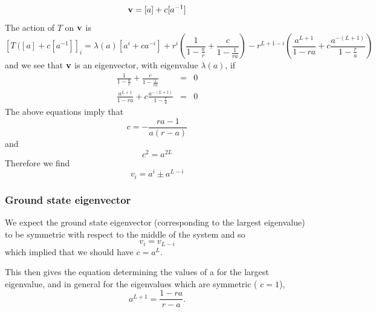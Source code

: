 \begin{equation}
{\bf v} = [a]+ c[a^{-1}]
\end{equation}
The action of $T$ on ${\bf v}$ is 
\begin{equation}
\left[T\ ([a]+c [a^{-1}]\right]_i = \lambda(a)[a^i + c a^{-i}]
+ r^i\left(\frac{1}{1-\frac{a}{r}}+ \frac{c}{1-\frac{1}{ra}}\right)
- r^{L+1-i} \left(\frac{a^{L+1}}{1-ra} + c\frac{a^{-(L+1)}}{1-\frac{r}{a}}\right)
\end{equation}
and we see that ${\bf v}$ is an eigenvector, with eigenvalue $\lambda(a)$, if
\begin{eqnarray}
\frac{1}{1-\frac{a}{r}}+ \frac{c}{1-\frac{1}{ra}}&=&0 \\
\frac{a^{L+1}}{1-ra} + c\frac{a^{-(L+1)}}{1-\frac{r}{a}} &=& 0
\end{eqnarray}
The above equations imply that 
\begin{equation}
c= -\frac{ra-1}{a(r-a)}
\end{equation}
and
\begin{equation}
c^2 = a^{2L}
\end{equation}
Therefore we find
\begin{equation}
v_i = a^i \pm a^{L-i}
\end{equation}

\subsubsection*{Ground state eigenvector}
We expect the ground state eigenvector (corresponding to the largest eigenvalue) to be symmetric with respect to the middle of the system and so 
\begin{equation}
v_i= v_{L-i}
\end{equation}
which implied that we should have $c= a^L$. 

This then gives the equation determining the values of a for the largest eigenvalue, and in general for the eigenvalues which are symmetric ( $c=1$),
\begin{equation}
a^{L+1} = \frac{1-ra}{r-a}.
\label{aeq}
\end{equation}

